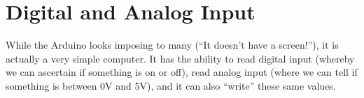 \chapter{Digital and Analog Input}
While the Arduino looks imposing to many (``It doesn't have a screen!''), it is actually a very simple computer. It has the ability to read digital input (whereby we can ascertain if something is on or off), read analog input (where we can tell if something is between 0V and 5V), and it can also ``write'' these same values.



\begin{comment}
% 
\section{}
\problem

\solution

\discussion

\makingthingsbreak

\seealso

\XXX
\end{comment}